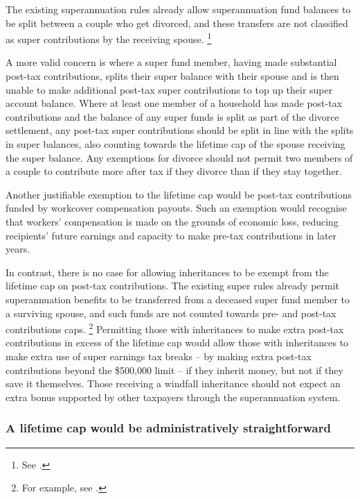 \documentclass[continuous]{grattan}\usepackage[]{graphicx}\usepackage[]{color}
\begin{document}
The existing superannuation rules already allow superannuation fund balances to be split between a couple who get divorced, and these transfers are not classified as super contributions by the receiving spouse.%
\footnote{See \textcites{AG-2016-Super-splitting-laws-FAQ}{ATO-2016-Super-and-relationship-breakdowns-APRA-funds}{ATO-2016-Super-and-relationship-breakdowns-SMSF-funds}.}

A more valid concern is where a super fund member, having made substantial post-tax contributions, splits their super balance with their spouse and is then unable to make additional post-tax super contributions to top up their super account balance. 
Where at least one member of a household has made post-tax contributions and the balance of any super funds is split as part of the divorce settlement, any post-tax super contributions should be split in line with the splits in super balances, also counting towards the lifetime cap of the spouse receiving the super balance. 
Any exemptions for divorce should not permit two members of a couple to contribute more after tax if they divorce than if they stay together.

Another justifiable exemption to the lifetime cap would be post-tax contributions funded by workcover compensation payouts. 
Such an exemption would recognise that workers’ compensation is made on the grounds of economic loss, reducing recipients’ future earnings and capacity to make pre-tax contributions in later years. 

In contrast, there is no case for allowing inheritances to be exempt from the lifetime cap on post-tax contributions. 
The existing super rules already permit superannuation benefits to be transferred from a deceased super fund member to a surviving spouse, and such funds are not counted towards pre- and post-tax contributions caps.%
\footnote{For example, see \textcites{ATO-2016-Super-death-benefits-APRA}{ATO-2016-Super-death-benefits-SMSF}.}   
Permitting those with inheritances to make extra post-tax contributions in excess of the lifetime cap would allow those with inheritances to make extra use of super earnings tax breaks – by making extra post-tax contributions beyond the \$500,000 limit -- if they inherit money, but not if they save it themselves.
Those receiving a windfall inheritance should not expect an extra bonus supported by other taxpayers through the superannuation system.

\subsubsection{A lifetime cap would be administratively straightforward} 
\end{document}
